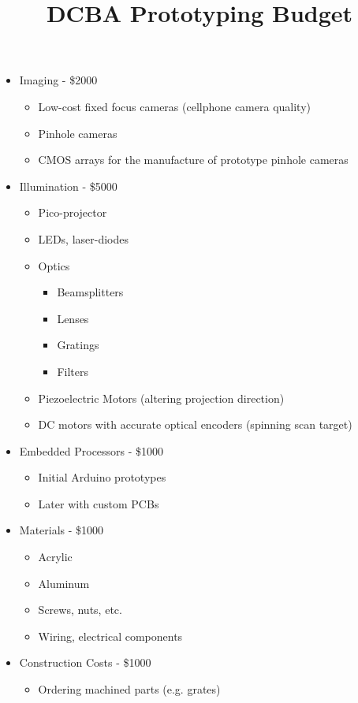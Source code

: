 \documentclass[10pt]{article}
\title{DCBA Prototyping Budget}
\begin{document}
\maketitle
\begin{itemize}
\item Imaging - \$2000
  \begin{itemize}
  \item Low-cost fixed focus cameras (cellphone camera quality)
  \item Pinhole cameras
  \item CMOS arrays for the manufacture of prototype pinhole cameras
  \end{itemize}
\item Illumination - \$5000
  \begin{itemize}
  \item Pico-projector 
  \item LEDs, laser-diodes
  \item Optics
    \begin{itemize}
    \item Beamsplitters
    \item Lenses
    \item Gratings
    \item Filters
    \end{itemize}
  \item Piezoelectric Motors (altering projection direction)
  \item DC motors with accurate optical encoders (spinning scan target)
  \end{itemize}
\item Embedded Processors - \$1000
  \begin{itemize}
  \item Initial Arduino prototypes
  \item Later with custom PCBs
  \end{itemize}
\item Materials - \$1000
  \begin{itemize}
  \item Acrylic
  \item Aluminum
  \item Screws, nuts, etc.
  \item Wiring, electrical components
  \end{itemize}
\item Construction Costs - \$1000
  \begin{itemize}
  \item Ordering machined parts (e.g. grates)
  \end{itemize}
\end{itemize}
\end{document}
